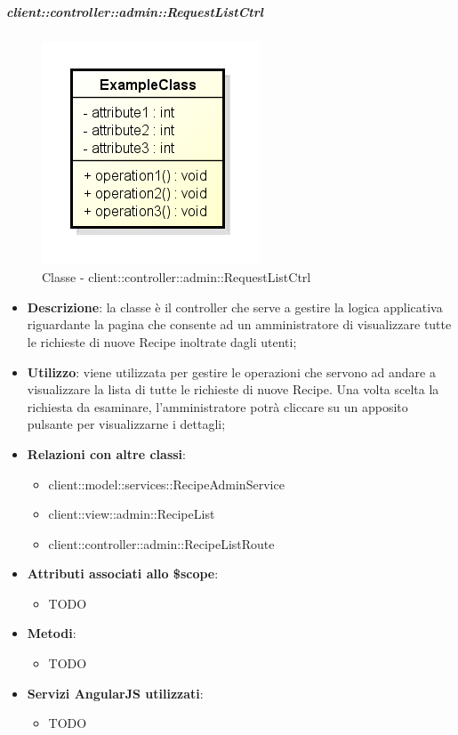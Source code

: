 		\subparagraph{client::controller::admin::RequestListCtrl} %
		\label{subp:bdsm_app_client_controller_admin_requestlistctrl}
			\begin{figure}[htbp]
				\centering
				\centerline{\includegraphics[scale=0.7]{./images/client/classes/example_class.png}}
				\caption{Classe - client::controller::admin::RequestListCtrl}
			\end{figure}
			\begin{itemize}
				\item \textbf{Descrizione}: la classe è il controller che serve a gestire la logica applicativa riguardante la pagina che consente ad un amministratore di visualizzare tutte le richieste di nuove Recipe inoltrate dagli utenti;
				\item \textbf{Utilizzo}: viene utilizzata per gestire le operazioni che servono ad andare a visualizzare la lista di tutte le richieste di nuove Recipe. Una volta scelta la richiesta da esaminare, l'amministratore potrà cliccare su un apposito pulsante per visualizzarne i dettagli;
				\item \textbf{Relazioni con altre classi}:
					\begin{itemize}
						\item client::model::services::RecipeAdminService
						\item client::view::admin::RecipeList
						\item client::controller::admin::RecipeListRoute
					\end{itemize}

				\item \textbf{Attributi associati allo \$scope}:
					\begin{itemize}
						\item TODO
					\end{itemize}

				\item \textbf{Metodi}:
					\begin{itemize}
						\item TODO
					\end{itemize}

				\item \textbf{Servizi AngularJS utilizzati}:
					\begin{itemize}
						\item TODO
					\end{itemize}

			\end{itemize}

